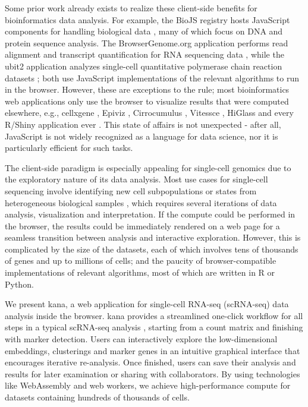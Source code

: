 \documentclass{article}
\begin{document}
Some prior work already exists to realize these client-side benefits for bioinformatics data analysis.
For example, the BioJS registry hosts JavaScript components for handling biological data \cite{gomez2013biojs}, many of which focus on DNA and protein sequence analysis.
The BrowserGenome.org application performs read alignment and transcript quantification for RNA sequencing data \cite{schmid2015browsergenome},
while the ubit2 application analyzes single-cell quantitative polymerase chain reaction datasets \cite{fan2017ubit2};
both use JavaScript implementations of the relevant algorithms to run in the browser.
However, these are exceptions to the rule; most bioinformatics web applications only use the browser to visualize results that were computed elsewhere,
e.g., cellxgene \cite{megill2021cellxgene}, Epiviz \cite{chelaru2014epiviz}, Cirrocumulus \cite{cirrocumulus}, Vitessce \cite{vitessce}, HiGlass \cite{kerpedjiev2018higlass} and every R/Shiny application ever \cite{shiny}.
This state of affairs is not unexpected - 
after all, JavaScript is not widely recognized as a language for data science, nor it is particularly efficient for such tasks.

The client-side paradigm is especially appealing for single-cell genomics due to the exploratory nature of its data analysis.
Most use cases for single-cell sequencing involve identifying new cell subpopulations or states from heterogeneous biological samples \cite{stegle2015computational},
which requires several iterations of data analysis, visualization and interpretation.
If the compute could be performed in the browser, the results could be immediately rendered on a web page for a seamless transition between analysis and interactive exploration.
However, this is complicated by the size of the datasets, each of which involves tens of thousands of genes and up to millions of cells;
and the paucity of browser-compatible implementations of relevant algorithms, most of which are written in R or Python.

We present kana, a web application for single-cell RNA-seq (scRNA-seq) data analysis inside the browser.
kana provides a streamlined one-click workflow for all steps in a typical scRNA-seq analysis \cite{amezquita2020orchestrating}, 
starting from a count matrix and finishing with marker detection.
Users can interactively explore the low-dimensional embeddings, clusterings and marker genes in an intuitive graphical interface that encourages iterative re-analysis.
Once finished, users can save their analysis and results for later examination or sharing with collaborators.
By using technologies like WebAssembly and web workers, we achieve high-performance compute for datasets containing hundreds of thousands of cells.
\end{document}
